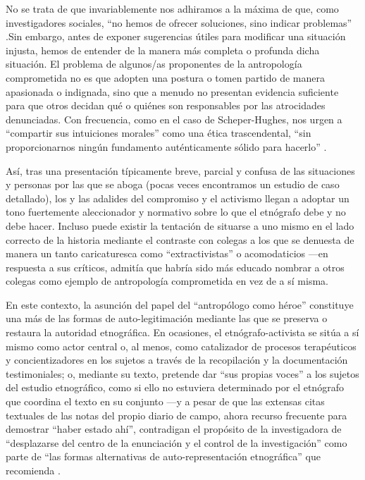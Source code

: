 \documentclass[
  spanish,
  11pt,
  a4paper,
]{scrbook}
\begin{document}
No se trata de que invariablemente nos adhiramos a la máxima de que,
como investigadores sociales, ``no hemos de ofrecer soluciones, sino
indicar problemas'' \autocite[40]{Weber1973}.Sin embargo, antes de
exponer sugerencias útiles para modificar una situación injusta, hemos
de entender de la manera más completa o profunda dicha situación. El
problema de algunos/as proponentes de la antropología comprometida no es
que adopten una postura o tomen partido de manera apasionada o
indignada, sino que a menudo no presentan evidencia suficiente para que
otros decidan qué o quiénes son responsables por las atrocidades
denunciadas. Con frecuencia, como en el caso de Scheper-Hughes, nos
urgen a ``compartir sus intuiciones morales'' como una ética
trascendental, ``sin proporcionarnos ningún fundamento auténticamente
sólido para hacerlo'' \autocite[363]{Gledhill2000}.

Así, tras una presentación típicamente breve, parcial y confusa de las
situaciones y personas por las que se aboga (pocas veces encontramos un
estudio de caso detallado), los y las adalides del compromiso y el
activismo llegan a adoptar un tono fuertemente aleccionador y normativo
sobre lo que el etnógrafo debe y no debe hacer. Incluso puede existir la
tentación de situarse a uno mismo en el lado correcto de la historia
mediante el contraste con colegas a los que se denuesta de manera un
tanto caricaturesca como ``extractivistas'' o acomodaticios ---en
respuesta a sus críticos, \autocite[438]{ScheperHughes1995} admitía que
habría sido más educado nombrar a otros colegas como ejemplo de
antropología comprometida en vez de a sí misma.

En este contexto, la asunción del papel del ``antropólogo como héroe''
constituye una más de las formas de auto-legitimación mediante las que
se preserva o restaura la autoridad etnográfica. En ocasiones, el
etnógrafo-activista se sitúa a sí mismo como actor central o, al menos,
como catalizador de procesos terapéuticos y concientizadores en los
sujetos a través de la recopilación y la documentación testimoniales; o,
mediante su texto, pretende dar ``sus propias voces'' a los sujetos del
estudio etnográfico, como si ello no estuviera determinado por el
etnógrafo que coordina el texto en su conjunto ---y a pesar de que las
extensas citas textuales de las notas del propio diario de campo, ahora
recurso frecuente para demostrar ``haber estado ahí'', contradigan el
propósito de la investigadora de ``desplazarse del centro de la
enunciación y el control de la investigación'' como parte de ``las
formas alternativas de auto-representación etnográfica'' que recomienda
\autocite[25]{Glockner2017}.
\end{document}
